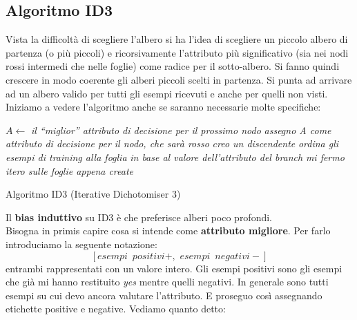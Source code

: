\documentclass[a4paper,12pt, oneside]{book}
\begin{document}
\subsection{Algoritmo ID3}
Vista la difficoltà di scegliere l'albero si ha l'idea di scegliere un piccolo
albero di partenza (o più piccoli) e ricorsivamente l'attributo più
significativo (sia nei nodi rossi intermedi che nelle foglie) come radice per il
sotto-albero. Si fanno quindi crescere in modo 
coerente gli alberi piccoli scelti in partenza. Si punta ad arrivare ad un
albero valido per tutti gli esempi ricevuti e anche per quelli non visti.\\
Iniziamo a vedere l'algoritmo anche se saranno necessarie molte specifiche:
\begin{algorithm}[H]
  \begin{algorithmic}
    \State $A \gets$ \textit{il ``miglior'' attributo di decisione per il
    prossimo nodo}
    \State \textit{assegno A come attributo di decisione per il nodo, che sarà
    rosso}
    \State \textit{creo un discendente}
    \EndFor
    \State \textit{ordina gli esempi di training alla foglia}
    \State \textit{in base al valore dell'attributo del branch}
    \State \textit{mi fermo}
    \Else
    \State \textit{itero sulle foglie appena create}
    \EndIf
    \EndFunction
  \end{algorithmic}
  \caption{Algoritmo ID3 (Iterative Dichotomiser 3)}
\end{algorithm}
Il \textbf{bias induttivo} su ID3 è che preferisce alberi poco profondi.\\
Bisogna in primis capire cosa si intende come \textbf{attributo migliore}. Per
farlo introduciamo la seguente notazione:
\[[esempi\,\,\,positivi+,\,\,esempi\,\,\,negativi-]\]
entrambi rappresentati con un valore intero. Gli esempi positivi sono gli esempi
che già mi hanno restituito \textit{yes} mentre quelli negativi. In generale
sono tutti esempi su cui devo ancora valutare l'attributo. E proseguo così
assegnando etichette positive e negative.
Vediamo quanto detto:

\begin{figure}[H]
  \centering
\end{figure}
\end{document}
